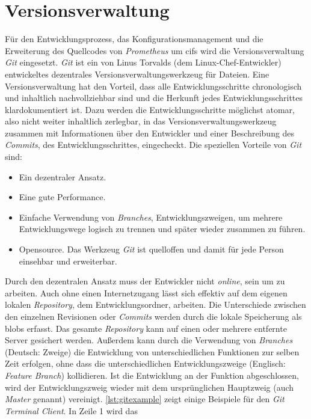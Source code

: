 \documentclass[titlepage]{report}
\begin{document}
\section{Versionsverwaltung}
Für den Entwicklungsprozess, das Konfigurationsmanagement und die
Erweiterung des Quellcodes von \emph{Prometheus} um \gls{cifs} wird die
Versionsverwaltung \emph{Git} eingesetzt. \emph{Git} ist ein von Linus
Torvalds (dem Linux\hyp{}Chef\hyp{}Entwickler) entwickeltes dezentrales
Versionsverwaltungswerkzeug für Dateien\cite{GITWIKI}. Eine
Versionsverwaltung hat den Vorteil, dass alle Entwicklungsschritte
chronologisch und inhaltlich nachvollziehbar sind und die Herkunft jedes
Entwicklungsschrittes klardokumentiert ist. Dazu werden die
Entwicklungsschritte möglichst atomar, also nicht weiter inhaltlich
zerlegbar, in das Versionsverwaltungswerkzeug zusammen mit Informationen
über den Entwickler und einer Beschreibung des \emph{Commits}, des
Entwicklungsschrittes, eingecheckt\cite{GITBOOK}. Die speziellen
Vorteile von \emph{Git} sind:
\begin{itemize}
    \item Ein dezentraler Ansatz.
    \item Eine gute Performance.
    \item Einfache Verwendung von \emph{Branches}, Entwicklungszweigen,
        um mehrere Entwicklungswege logisch zu trennen und später wieder
        zusammen zu führen.
    \item Opensource. Das Werkzeug \emph{Git} ist quelloffen und damit
        für jede Person einsehbar und erweiterbar.
\end{itemize}
Durch den dezentralen Ansatz muss der Entwickler nicht
\emph{online}, sein um zu arbeiten. Auch ohne einen Internetzugang lässt
sich effektiv auf dem eigenen lokalen \emph{Repository}, dem
Entwicklungsordner, arbeiten. Die Unterschiede zwischen den einzelnen
Revisionen oder \emph{Commits} werden durch die lokale Speicherung als
\glspl{blob} erfasst. Das gesamte \emph{Repository} kann auf einen oder
mehrere entfernte Server gesichert werden\cite{GITOTTO}. Außerdem kann
durch die Verwendung von \emph{Branches} (Deutsch: Zweige) die
Entwicklung von unterschiedlichen Funktionen zur selben Zeit erfolgen,
ohne dass die unterschiedlichen Entwicklungszweige (Englisch:
\emph{Feature Branch}) kollidieren. Ist die Entwicklung an der Funktion
abgeschlossen, wird
der Entwicklungszweig wieder mit dem ursprünglichen Hauptzweig (auch
\emph{Master} genannt) vereinigt. \autoref{lst:gitexample} zeigt einige
Beispiele für den \emph{Git Terminal Client}. In Zeile 1 wird das
\end{document}
